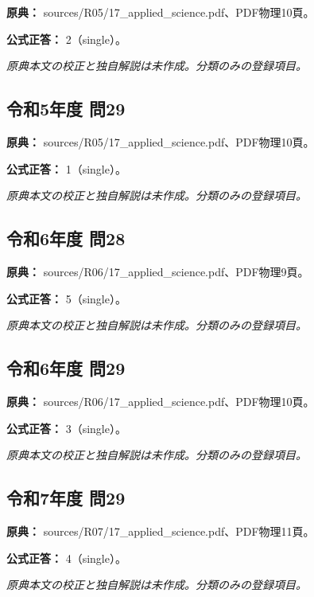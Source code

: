 \noindent\textbf{原典：} sources/R05/17\_applied\_science.pdf、PDF物理10頁。

\textbf{公式正答：} 2（single）。

\par\textit{原典本文の校正と独自解説は未作成。分類のみの登録項目。}

\subsection{令和5年度 問29}
\label{q:r05-reg-applied-29}

\noindent\textbf{原典：} sources/R05/17\_applied\_science.pdf、PDF物理10頁。

\textbf{公式正答：} 1（single）。

\par\textit{原典本文の校正と独自解説は未作成。分類のみの登録項目。}

\subsection{令和6年度 問28}
\label{q:r06-reg-applied-28}

\noindent\textbf{原典：} sources/R06/17\_applied\_science.pdf、PDF物理9頁。

\textbf{公式正答：} 5（single）。

\par\textit{原典本文の校正と独自解説は未作成。分類のみの登録項目。}

\subsection{令和6年度 問29}
\label{q:r06-reg-applied-29}

\noindent\textbf{原典：} sources/R06/17\_applied\_science.pdf、PDF物理10頁。

\textbf{公式正答：} 3（single）。

\par\textit{原典本文の校正と独自解説は未作成。分類のみの登録項目。}

\subsection{令和7年度 問29}
\label{q:r07-reg-applied-29}

\noindent\textbf{原典：} sources/R07/17\_applied\_science.pdf、PDF物理11頁。

\textbf{公式正答：} 4（single）。

\par\textit{原典本文の校正と独自解説は未作成。分類のみの登録項目。}

